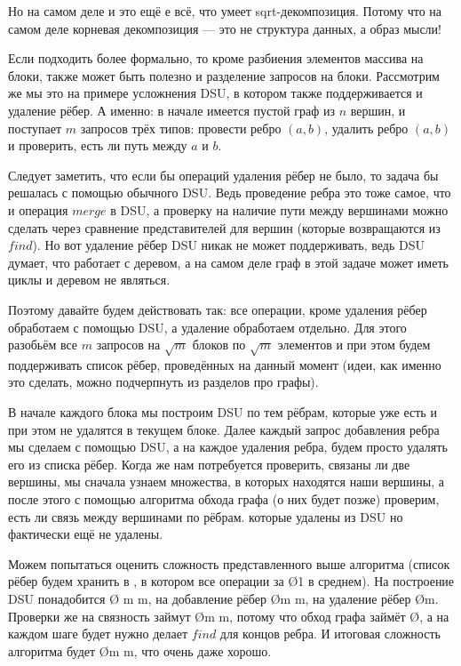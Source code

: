 
Но на самом деле и это ещё е всё, что умеет sqrt-декомпозиция. Потому что на самом деле корневая декомпозиция — это не структура данных, а образ мысли!

Если подходить более формально, то кроме разбиения элементов массива на блоки, также может быть полезно и разделение запросов на блоки. Рассмотрим же мы это на примере усложнения DSU, в котором также поддерживается и удаление рёбер. А именно: в начале имеется пустой граф из $n$ вершин, и поступает $m$ запросов трёх типов: провести ребро $(a, b)$, удалить ребро $(a, b)$ и проверить, есть ли путь между $a$ и $b$.

Следует заметить, что если бы операций удаления рёбер не было, то задача бы решалась с помощью обычного DSU. Ведь проведение ребра это тоже самое, что и операция $merge$ в DSU, а проверку на наличие пути между вершинами можно сделать через сравнение представителей для вершин (которые возвращаются из $find$). Но вот удаление рёбер DSU никак не может поддерживать, ведь DSU думает, что работает с деревом, а на самом деле граф в этой задаче может иметь циклы и деревом не являться.

Поэтому давайте будем действовать так: все операции, кроме удаления рёбер обработаем с помощью DSU, а удаление обработаем отдельно. Для этого разобьём все $m$ запросов на $\sqrt{m}$ блоков по $\sqrt{m}$ элементов и при этом будем поддерживать список рёбер, проведённых на данный момент (идеи, как именно это сделать, можно подчерпнуть из разделов про графы).

В начале каждого блока мы построим DSU по тем рёбрам, которые уже есть и при этом не удалятся в текущем блоке. Далее каждый запрос добавления ребра мы сделаем с помощью DSU, а на каждое удаления ребра, будем просто удалять его из списка рёбер. Когда же нам потребуется проверить, связаны ли две вершины, мы сначала узнаем множества, в которых находятся наши вершины, а после этого с помощью алгоритма обхода графа (о них будет позже) проверим, есть ли связь между вершинами по рёбрам. которые удалены из DSU но фактически ещё не удалены.

Можем попытаться оценить сложность представленного выше алгоритма (список рёбер будем хранить в , в котором все операции за \O{1} в среднем). На построение DSU понадобится \O{ \cdot m \ac{m}}, на добавление рёбер \O{m \ac{m}}, на удаление рёбер \O{m}. Проверки же на связность займут \O{m  \ac{m}}, потому что обход графа займёт \O{}, а на каждом шаге будет нужно делает $find$ для концов ребра. И итоговая сложность алгоритма будет \O{m  \ac{m}}, что очень даже хорошо.
